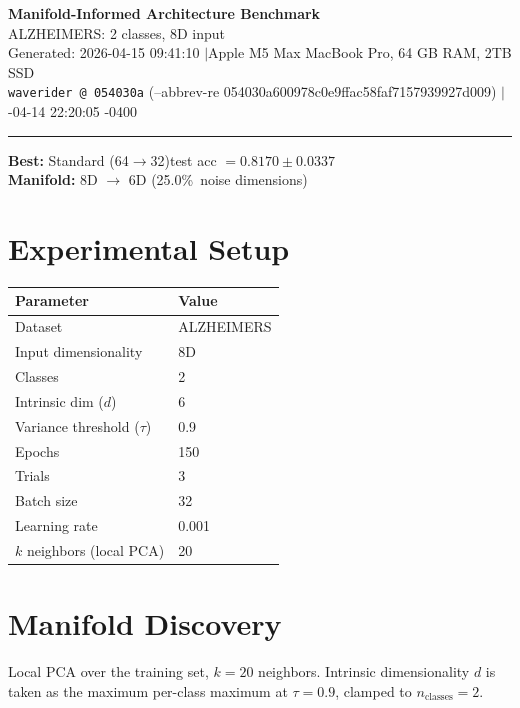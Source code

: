 \documentclass[11pt,letterpaper]{article}
\begin{document}
\begin{center}
  {\LARGE\bfseries\color{wavblue} Manifold-Informed Architecture Benchmark}\\[6pt]
  {\large ALZHEIMERS: 2 classes, 8D input}\\[8pt]
  {\small Generated: 2026-04-15 09:41:10 \quad$|$\quad Apple M5 Max MacBook Pro, 64 GB RAM, 2TB SSD}\\[2pt]
  {\small\texttt{waverider @ 054030a} (--abbrev-re
054030a600978c0e9ffac58faf7157939927d009) \quad$|$-04-14 22:20:05 -0400}
\end{center}
{\color{wavblue}\noindent\rule{\linewidth}{1.5pt}}
\medskip

\noindent\colorbox{wavlight}{\parbox{\dimexpr\linewidth-2\fboxsep\relax}{
  \smallskip
  \textbf{Best:} Standard (64$\rightarrow$32)\quad test acc $= 0.8170 \pm 0.0337$\\[2pt]
  \textbf{Manifold:} 8D $\rightarrow$ 6D (25.0\%\ noise dimensions)\\[2pt]
  \smallskip
}}
\bigskip

\section{Experimental Setup}

\begin{tabular}{@{}ll@{}}
\toprule
\textbf{Parameter} & \textbf{Value} \\
\midrule
  Dataset & ALZHEIMERS \\
  Input dimensionality & 8D \\
  Classes & 2 \\
  Intrinsic dim ($d$) & 6 \\
  Variance threshold ($\tau$) & 0.9 \\
  Epochs & 150 \\
  Trials & 3 \\
  Batch size & 32 \\
  Learning rate & 0.001 \\
  $k$ neighbors (local PCA) & 20 \\
\bottomrule
\end{tabular}

\section{Manifold Discovery}

Local PCA over the training set, $k = 20$ neighbors. Intrinsic dimensionality $d$ is taken as the maximum per-class maximum at $\tau = 0.9$, clamped to $n_{\mathrm{classes}} = 2$.
\end{document}
